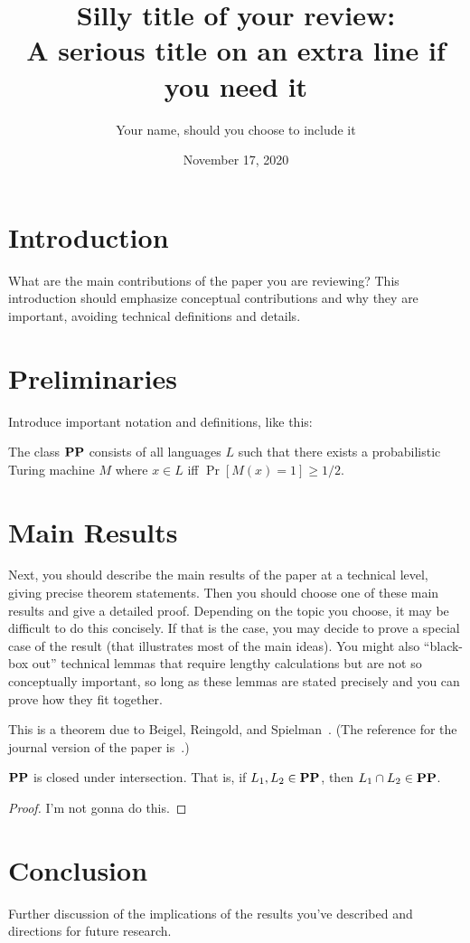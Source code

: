\documentclass[11pt]{article}
\author{Your name, should you choose to include it}
\title{Silly title of your review: \\ A serious title on an extra line if you need it}
\date{November 17, 2020}
\begin{document}
	\maketitle
	
\section{Introduction}

What are the main contributions of the paper you are reviewing? This introduction should emphasize conceptual contributions and why they are important, avoiding technical definitions and details.

\section{Preliminaries}

Introduce important notation and definitions, like this:

\begin{definition}
	The class $\mathbf{PP}$ consists of all languages $L$ such that there exists a probabilistic Turing machine $M$ where $x \in L$ iff $\Pr[M(x) = 1] \ge 1/2$.
\end{definition}

\section{Main Results}

Next, you should describe the main results of the paper at a technical level, giving precise theorem statements. Then you should choose one of these main results and give a detailed proof. Depending on the topic you choose, it may be difficult to do this concisely. If that is the case, you may decide to prove a special case of the result (that illustrates most of the main ideas). You might also ``black-box out'' technical lemmas that require lengthy calculations but are not so conceptually important, so long as these lemmas are stated precisely and you can prove how they fit together.

This is a theorem due to Beigel, Reingold, and Spielman~\cite{brsconf}. (The reference for the journal version of the paper is~\cite{brsjournal}.)

\begin{theorem}
	$\mathbf{PP}$ is closed under intersection. That is, if $L_1, L_2 \in \mathbf{PP}$, then $L_1 \cap L_2 \in \mathbf{PP}$.
\end{theorem}

\begin{proof}
	I'm not gonna do this.
\end{proof}

\section{Conclusion}

Further discussion of the implications of the results you've described and directions for future research. 



\end{document}
